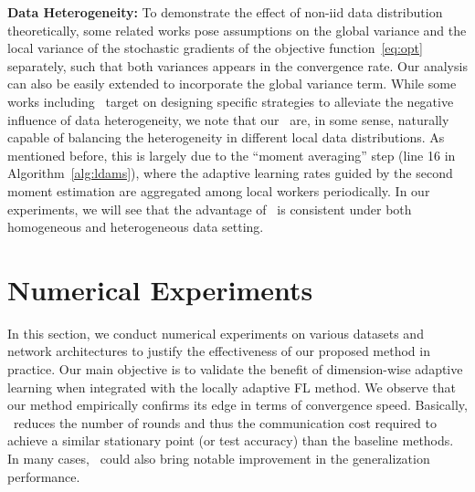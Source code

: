 \documentclass[nohyperref]{article}
\begin{document}
\vspace{0.1in}
\noindent\textbf{Data Heterogeneity:} To demonstrate the effect of non-iid data distribution theoretically, some related works pose assumptions on the global variance and the local variance of the stochastic gradients of the objective function~\eqref{eq:opt} separately, such that both variances appears in the convergence rate. Our analysis can also be easily extended to incorporate the global variance term. While some works including~\citet{karimireddy2019scaffold} target on designing specific strategies to alleviate the negative influence of data heterogeneity, we note that our \algo\ are, in some sense, naturally capable of balancing the heterogeneity in different local data distributions. As mentioned before, this is largely due to the ``moment averaging'' step (line 16 in Algorithm~\ref{alg:ldams}), where the adaptive learning rates guided by the second moment estimation are aggregated among local workers periodically. In our experiments, we will see that the advantage of \algo\ is consistent under both homogeneous and heterogeneous data setting. 





\section{Numerical Experiments}\label{sec:numerical}

In this section, we conduct numerical experiments on various datasets and network architectures to justify the effectiveness of our proposed method in practice. Our main objective is to validate the benefit of dimension-wise adaptive learning when integrated with the locally adaptive FL method.
We observe that our method empirically confirms its edge in terms of convergence speed.
Basically, \algo\ reduces the number of rounds and thus the communication cost required to achieve a similar stationary point (or test accuracy) than the baseline methods. In many cases, \algo\ could also bring notable improvement in the generalization performance.
\end{document}
